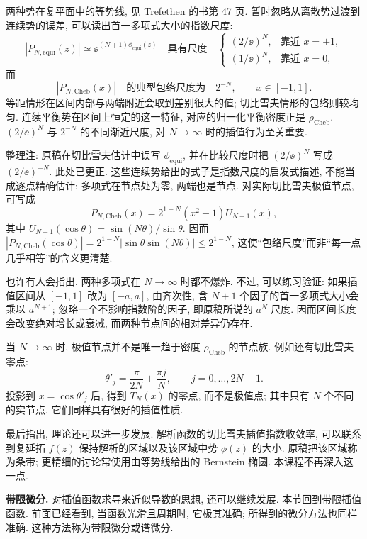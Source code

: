 两种势在复平面中的等势线, 见 Trefethen 的书第 47 页. 暂时忽略从离散势过渡到连续势的误差, 可以读出首一多项式大小的指数尺度:
\[
|P_{N,\mathrm{equi}}(z)|\simeq\ee^{(N+1)\phi_{\mathrm{equi}}(z)}
\quad\text{具有尺度}\quad
\begin{cases}(2/\ee)^N,&\text{靠近 }x=\pm1,\\
(1/\ee)^N,&\text{靠近 }x=0,
\end{cases}
\]
而
\[
|P_{N,\mathrm{Cheb}}(x)|\quad\text{的典型包络尺度为}\quad2^{-N},
\qquad x\in[-1,1].
\]
等距情形在区间内部与两端附近会取到差别很大的值; 切比雪夫情形的包络则较均匀. 连续平衡势在区间上恒定的这一特征, 对应的归一化平衡密度正是 $\rho_{\mathrm{Cheb}}$. $(2/\ee)^N$ 与 $2^{-N}$ 的不同渐近尺度, 对 $N\to\infty$ 时的插值行为至关重要.
\begin{remark}
整理注: 原稿在切比雪夫估计中误写 $\phi_{\mathrm{equi}}$, 并在比较尺度时把 $(2/\ee)^N$ 写成 $(2/\ee)^{-N}$. 此处已更正. 这些连续势给出的式子是指数尺度的启发式描述, 不能当成逐点精确估计: 多项式在节点处为零, 两端也是节点. 对实际切比雪夫极值节点, 可写成
\[
P_{N,\mathrm{Cheb}}(x)=2^{1-N}(x^2-1)U_{N-1}(x),
\]
其中 $U_{N-1}(\cos\theta)=\sin(N\theta)/\sin\theta$. 因而
$|P_{N,\mathrm{Cheb}}(\cos\theta)|=2^{1-N}|\sin\theta\sin(N\theta)|\le2^{1-N}$,
这使“包络尺度”而非“每一点几乎相等”的含义更清楚.
\end{remark}

也许有人会指出, 两种多项式在 $N\to\infty$ 时都不爆炸. 不过, 可以练习验证: 如果插值区间从 $[-1,1]$ 改为 $[-a,a]$, 由齐次性, 含 $N+1$ 个因子的首一多项式大小会乘以 $a^{N+1}$; 忽略一个不影响指数阶的因子, 即原稿所说的 $a^N$ 尺度. 因而区间长度会改变绝对增长或衰减, 而两种节点间的相对差异仍存在.

当 $N\to\infty$ 时, 极值节点并不是唯一趋于密度 $\rho_{\mathrm{Cheb}}$ 的节点族. 例如还有切比雪夫零点:
\[
\theta'_j=\frac\pi{2N}+\frac{\pi j}N,\qquad j=0,\ldots,2N-1.
\]
投影到 $x=\cos\theta'_j$ 后, 得到 $T_N(x)$ 的零点, 而不是极值点; 其中只有 $N$ 个不同的实节点. 它们同样具有很好的插值性质.

最后指出, 理论还可以进一步发展. 解析函数的切比雪夫插值指数收敛率, 可以联系到复延拓 $f(z)$ 保持解析的区域以及该区域中势 $\phi(z)$ 的大小. 原稿把该区域称为条带; 更精细的讨论常使用由等势线给出的 Bernstein 椭圆. 本课程不再深入这一点.

\label{sec:spectral-differentiation}
\textbf{带限微分.} 对插值函数求导来近似导数的思想, 还可以继续发展. 本节回到带限插值函数. 前面已经看到, 当函数光滑且周期时, 它极其准确; 所得到的微分方法也同样准确. 这种方法称为带限微分或谱微分.

